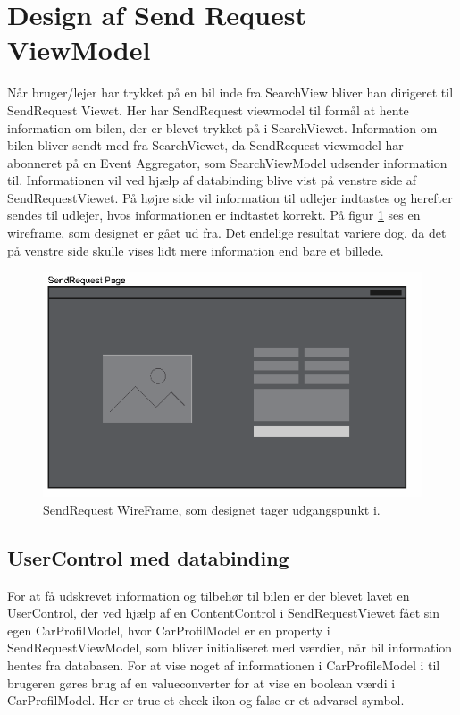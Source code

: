 \documentclass[SoftwareDesign/SoftwareDesign_main.tex]{subfiles}
\begin{document}
\section{Design af Send Request ViewModel}
Når bruger/lejer har trykket på en bil inde fra SearchView bliver han dirigeret til SendRequest Viewet. Her har SendRequest viewmodel til formål at hente information om bilen, der er blevet trykket på i SearchViewet. Information om bilen bliver sendt med fra SearchViewet, da SendRequest viewmodel har abonneret på en Event Aggregator, som SearchViewModel udsender information til. Informationen vil ved hjælp af databinding blive vist på venstre side af SendRequestViewet. På højre side vil information til udlejer indtastes og herefter sendes til udlejer, hvos informationen er indtastet korrekt. På figur \ref{fig:sendrequestwirefram} ses en wireframe, som designet er gået ud fra. Det endelige resultat variere dog, da det på venstre side skulle vises lidt mere information end bare et billede.
\begin{figure}[H]
    \centering
    \includegraphics[width=\textwidth]{SoftwareDesign/MVVMDesigns/Graphics/SendRequestWireFrame.PNG}
    \caption{SendRequest WireFrame, som designet tager udgangspunkt i.}
    \label{fig:sendrequestwirefram}
\end{figure}

\subsection{UserControl med databinding}
For at få udskrevet information og tilbehør til bilen er der blevet lavet en UserControl, der ved hjælp af en ContentControl i SendRequestViewet fået sin egen CarProfilModel, hvor CarProfilModel er en property i SendRequestViewModel, som bliver initialiseret med værdier, når bil information hentes fra databasen. For at vise noget af informationen i CarProfileModel i til brugeren gøres brug af en valueconverter for at vise en boolean værdi i CarProfilModel. Her er true et check ikon og false er et advarsel symbol.
\end{document}
